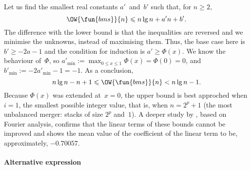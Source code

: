 Let us find the smallest real constants \(a'\)~and~\(b'\) such that,
for \(n \geqslant 2\),
\begin{equation*}
\OW{\fun{bms}}{n} \leqslant n\lg n + a'n + b'.
\end{equation*}
The difference with the lower bound is that the inequalities are
reversed and we minimise the unknowns, instead of maximising
them. Thus, the base case here is \(b' \geqslant -2a - 1\) and the
condition for induction is \(a' \geqslant \Phi(x)\). We know the
behaviour of~\(\Phi\), so \(a'_{\min} := \max_{0 \leqslant x \leqslant
  1}\Phi(x) = \Phi(0) = 0\), and \(b'_{\min} := -2a'_{\min} - 1 =
-1\). As a conclusion,
\begin{equation}
n\lg n - n + 1 \leqslant \OW{\fun{bms}}{n} < n\lg n - 1.
\label{ineq:OWbms}
\end{equation}
Because \(\Phi(x)\) was extended at~\(x=0\), the upper bound is best
approched when \(i=1\), the smallest possible integer value, that is,
when \(n=2^p+1\) (the most unbalanced merger: stacks of size \(2^p\)
and~\(1\)). A deeper study by \cite{PannyProdinger_1995}, based on
Fourier analysis, confirms that the linear terms of these bounds
cannot be improved and shows the mean value of the coefficient of the
linear term to be, approximately, \(-0.70057\).

\paragraph{Alternative expression}

